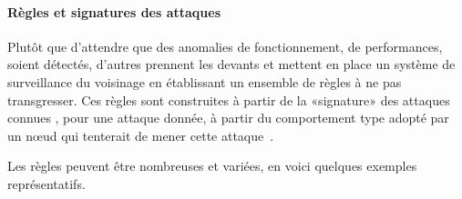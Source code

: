 \paragraph{Règles et signatures des attaques}\label{ea:par:rules}
Plutôt que d'attendre que des anomalies de fonctionnement, de performances, soient détectés, d'autres \IDS prennent les devants et mettent en place un système de surveillance du voisinage en établissant un ensemble de règles à ne pas transgresser.
Ces règles sont construites à partir de la «signature» des attaques connues \cad, pour une attaque donnée, à partir du comportement type adopté par un nœud qui tenterait de mener cette attaque~\cite{BMS13}.

Les règles peuvent être nombreuses et variées, en voici quelques exemples représentatifs.
